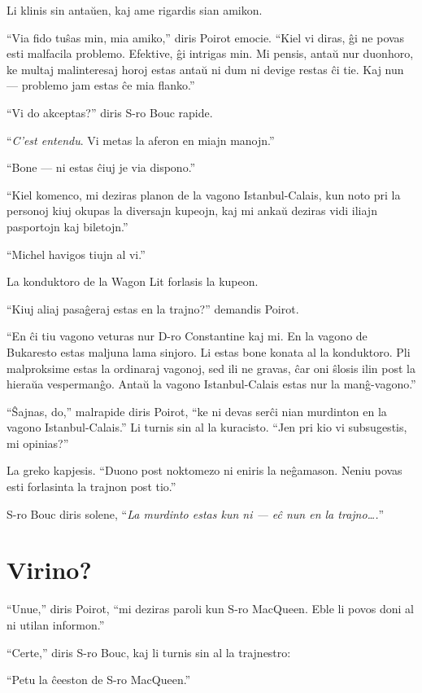 Li klinis sin antaŭen, kaj ame rigardis sian amikon.

``Via fido tuŝas min, mia amiko,'' diris Poirot emocie. ``Kiel vi diras, ĝi ne povas esti malfacila problemo. Efektive, ĝi intrigas min. Mi pensis, antaŭ nur duonhoro, ke multaj malinteresaj horoj estas antaŭ ni dum ni devige restas ĉi tie. Kaj nun --- problemo jam estas ĉe mia flanko.''

``Vi do akceptas?'' diris S-ro Bouc rapide.

``\emph{C'est entendu}. Vi metas la aferon en miajn manojn.''

``Bone --- ni estas ĉiuj je via dispono.''

``Kiel komenco, mi deziras planon de la vagono Istanbul-Calais, kun noto pri la personoj kiuj okupas la diversajn kupeojn, kaj mi ankaŭ deziras vidi iliajn pasportojn kaj biletojn.''

``Michel havigos tiujn al vi.''

La konduktoro de la Wagon Lit forlasis la kupeon.

``Kiuj aliaj pasaĝeraj estas en la trajno?'' demandis Poirot.

``En ĉi tiu vagono veturas nur D-ro Constantine kaj mi. En la vagono de Bukaresto estas maljuna lama sinjoro. Li estas bone konata al la konduktoro. Pli malproksime estas la ordinaraj vagonoj, sed ili ne gravas, ĉar oni ŝlosis ilin post la hieraŭa vespermanĝo. Antaŭ la vagono Istanbul-Calais estas nur la manĝ-vagono.''

``Ŝajnas, do,'' malrapide diris Poirot, ``ke ni devas serĉi nian murdinton en la vagono Istanbul-Calais.'' Li turnis sin al la kuracisto. ``Jen pri kio vi subsugestis, mi opinias?''

La greko kapjesis. ``Duono post noktomezo ni eniris la neĝamason. Neniu povas esti forlasinta la trajnon post tio.''

S-ro Bouc diris solene, ``\emph{La murdinto estas kun ni --- eĉ nun en la trajno{\ldots}.}''

\chapter[Virino?]{Virino?}


``Unue,'' diris Poirot, ``mi deziras paroli kun S-ro MacQueen. Eble li povos doni al ni utilan informon.''

``Certe,'' diris S-ro Bouc, kaj li turnis sin al la trajnestro:

``Petu la ĉeeston de S-ro MacQueen.''

